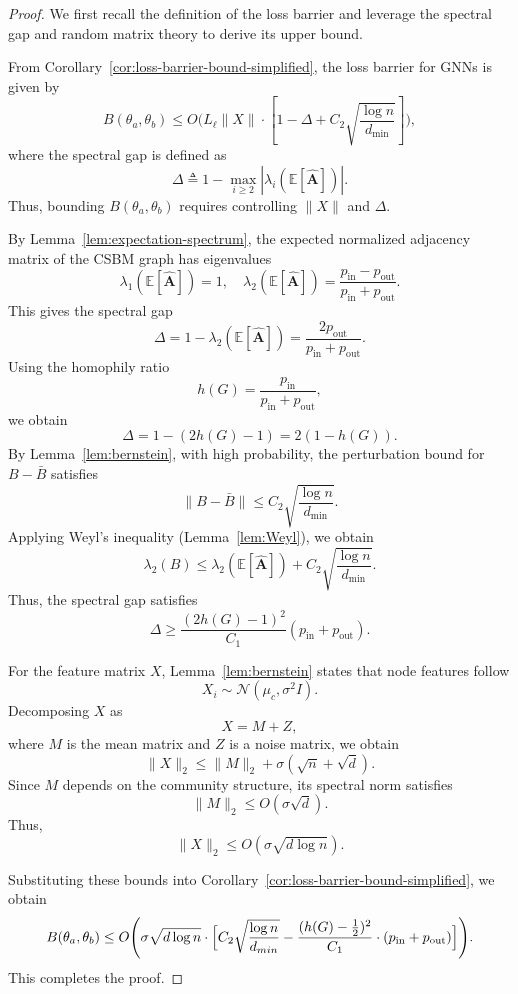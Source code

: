 \begin{proof} 
We first recall the definition of the loss barrier and leverage the spectral gap and random matrix theory to derive its upper bound.  

From Corollary~\ref{cor:loss-barrier-bound-simplified}, the loss barrier for GNNs is given by  
\begin{equation}
    B(\theta_a, \theta_b) \leq O\Biggl( L_\ell\|X\|\cdot \left[1 - \Delta + C_2 \sqrt{\frac{\log n}{d_{\min}}}\right]  \Biggr),
\end{equation}
where the spectral gap is defined as  
\[
\Delta \triangleq 1 - \max_{i\ge 2} |\lambda_i(\mathbb{E}[\hat{\mathbf{A}}])|.
\]
Thus, bounding \( B(\theta_a, \theta_b) \) requires controlling \( \|X\| \) and \( \Delta \).  

By Lemma~\ref{lem:expectation-spectrum}, the expected normalized adjacency matrix of the CSBM graph has eigenvalues  
\[
\lambda_1(\mathbb{E}[\hat{\mathbf{A}}]) = 1, \quad \lambda_2(\mathbb{E}[\hat{\mathbf{A}}]) = \frac{p_{\mathrm{in}}-p_{\mathrm{out}}}{p_{\mathrm{in}}+p_{\mathrm{out}}}.
\]
This gives the spectral gap  
\[
\Delta = 1 - \lambda_2(\mathbb{E}[\hat{\mathbf{A}}]) = \frac{2 p_{\mathrm{out}}}{p_{\mathrm{in}} + p_{\mathrm{out}}}.
\]
Using the homophily ratio  
\[
h(G) = \frac{p_{\mathrm{in}}}{p_{\mathrm{in}} + p_{\mathrm{out}}},
\]
we obtain  
\[
\Delta = 1 - (2h(G) - 1) = 2(1-h(G)).
\]
By Lemma~\ref{lem:bernstein}, with high probability, the perturbation bound for \( B - \bar{B} \) satisfies  
\[
\|B - \bar{B} \| \leq C_2 \sqrt{\frac{\log n}{d_{\min}}}.
\]
Applying Weyl's inequality (Lemma~\ref{lem:Weyl}), we obtain  
\[
\lambda_2(B) \leq \lambda_2(\mathbb{E}[\hat{\mathbf{A}}]) + C_2 \sqrt{\frac{\log n}{d_{\min}}}.
\]
Thus, the spectral gap satisfies  
\begin{equation}
    \Delta \geq \frac{(2h(G)-1)^2}{C_1} (p_{\mathrm{in}} + p_{\mathrm{out}}).
\end{equation}

For the feature matrix \( X \), Lemma~\ref{lem:bernstein} states that node features follow  
\[
X_i \sim \mathcal{N}(\mu_c, \sigma^2 I).
\]
Decomposing \( X \) as  
\[
X = M + Z,
\]
where \( M \) is the mean matrix and \( Z \) is a noise matrix, we obtain  
\[
\|X\|_2 \leq \|M\|_2 + \sigma (\sqrt{n} + \sqrt{d}).
\]
Since \( M \) depends on the community structure, its spectral norm satisfies  
\[
\|M\|_2 \leq O(\sigma \sqrt{d}).
\]
Thus,  
\[
\|X\|_2 \leq O(\sigma \sqrt{d \log n}).
\]

Substituting these bounds into Corollary~\ref{cor:loss-barrier-bound-simplified}, we obtain  
\[
B(\theta_a,\theta_b) \leq O\Biggl( \sigma \sqrt{d \log n}\cdot\Bigl[ C_2 \sqrt{\frac{\log n}{d_{min}}} - \frac{(h(G)-\frac{1}{2})^2}{C_1}\cdot(p_{\mathrm{in}} + p_{\mathrm{out}})  \Bigr] \Biggr).
\]
This completes the proof.
\end{proof}

